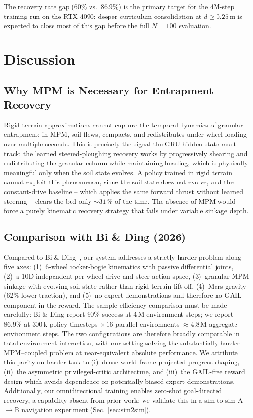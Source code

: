\documentclass[conference]{IEEEtran}
\begin{document}
The recovery rate gap (60\% vs.\ 86.9\%) is the primary target for the 4M-step
training run on the RTX 4090: deeper curriculum consolidation at $d \geq 0.25$\,m
is expected to close most of this gap before the full $N=100$ evaluation.

\section{Discussion}
\label{sec:discussion}

\subsection{Why MPM is Necessary for Entrapment Recovery}

Rigid terrain approximations cannot capture the temporal dynamics of granular
entrapment: in MPM, soil flows, compacts, and redistributes under wheel loading
over multiple seconds. This is precisely the signal the GRU hidden state must
track: the learned steered-ploughing recovery works by progressively shearing
and redistributing the granular column while maintaining heading, which is
physically meaningful only when the soil state evolves. A policy trained in
rigid terrain cannot exploit this phenomenon, since the soil state does not
evolve, and the constant-drive baseline -- which applies the same forward thrust
without learned steering -- clears the bed only ${\sim}31\,\%$ of the time. The
absence of MPM would force a purely kinematic recovery strategy that fails under
variable sinkage depth.

\subsection{Comparison with Bi \& Ding (2026)}

Compared to Bi \& Ding~\cite{bi2026escape}, our system addresses a strictly
harder problem along five axes: (1)~6-wheel rocker-bogie kinematics with
passive differential joints, (2)~a 10D independent per-wheel drive-and-steer
action space, (3)~granular MPM sinkage with evolving soil state rather than
rigid-terrain lift-off, (4)~Mars gravity (62\% lower traction), and (5)~no
expert demonstrations and therefore no GAIL component in the reward. The
sample-efficiency comparison must be made carefully: Bi \& Ding report
90\% success at 4\,M environment steps; we report 86.9\% at 300\,k policy
timesteps $\times\,16$ parallel environments $\approx 4.8$\,M aggregate
environment steps. The two configurations are therefore broadly comparable in
total environment interaction, with our setting solving the substantially
harder MPM--coupled problem at near-equivalent absolute performance. We
attribute this parity-on-harder-task to (i)~dense world-frame projected
progress shaping, (ii)~the asymmetric privileged-critic architecture, and
(iii)~the GAIL-free reward design which avoids dependence on potentially
biased expert demonstrations. Additionally, our omnidirectional training
enables zero-shot goal-directed recovery, a capability absent from prior
work; we validate this in a sim-to-sim A$\to$B navigation experiment
(Sec.~\ref{sec:sim2sim}).
\end{document}
